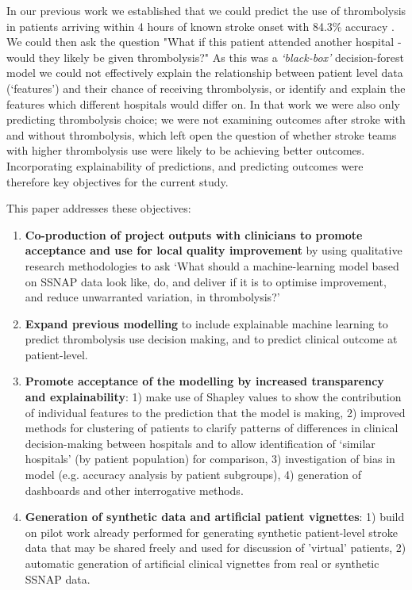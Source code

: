 
In our previous work we established that we could predict the use of thrombolysis in patients arriving within 4 hours of known stroke onset with 84.3\% accuracy \cite{allen_use_2022}. We could then ask the question "What if this patient attended another hospital - would they likely be given thrombolysis?" As this was a \emph{`black-box'} decision-forest model we could not effectively explain the relationship between patient level data (`features') and their chance of receiving thrombolysis, or identify and explain the features which different hospitals would differ on. In that work we were also only predicting thrombolysis choice; we were not examining outcomes after stroke with and without thrombolysis, which left open the question of whether stroke teams with higher thrombolysis use were likely to be achieving better outcomes. Incorporating explainability of predictions, and predicting outcomes were therefore key objectives for the current study.

This paper addresses these objectives:

\begin{enumerate}

    \item \textbf{Co-production of project outputs with clinicians to promote acceptance and use for local quality improvement} by using qualitative research methodologies to ask `What should a machine-learning model based on SSNAP data look like, do, and deliver if it is to optimise improvement, and reduce unwarranted variation, in thrombolysis?'

    \item \textbf{Expand previous modelling} to include explainable machine learning to predict thrombolysis use decision making, and to predict clinical outcome at patient-level.

    \item \textbf{Promote acceptance of the modelling by increased transparency and explainability}: 1) make use of Shapley values to show the contribution of individual features to the prediction that the model is making, 2) improved methods for clustering of patients to clarify patterns of differences in clinical decision-making between hospitals and to allow identification of ‘similar hospitals’ (by patient population) for comparison, 3) investigation of bias in model (e.g. accuracy analysis by patient subgroups), 4) generation of dashboards and other interrogative methods.

    \item \textbf{Generation of synthetic data and artificial patient vignettes}: 1) build on pilot work already performed for generating synthetic patient-level stroke data that may be shared freely and used for discussion of ’virtual’ patients, 2) automatic generation of artificial clinical vignettes from real or synthetic SSNAP data.
    
\end{enumerate}